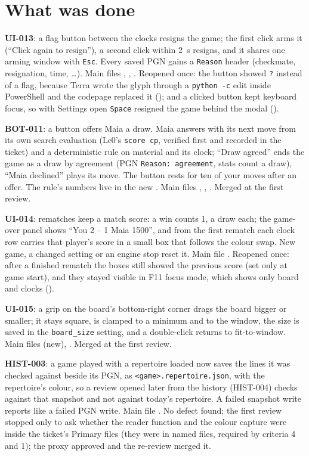 \documentclass[11pt,a4paper]{article}
\begin{document}
\section*{What was done}

\textbf{UI-013}: a flag button between the clocks resigns the game; the first click arms it
(``Click again to resign''), a second click within 2~s resigns, and it shares one arming window
with \texttt{Esc}. Every saved PGN gains a \texttt{Reason} header (checkmate, resignation, time,
\dots). Main files , , . Reopened once:
the button showed \texttt{?} instead of a flag, because Terra wrote the glyph through a
\texttt{python -c} edit inside PowerShell and the codepage replaced it ();
and a clicked button kept keyboard focus, so with Settings open \texttt{Space} resigned the
game behind the modal ().

\textbf{BOT-011}: a \textonehalf{} button offers Maia a draw. Maia answers with its next move
from its own search evaluation (Lc0's \texttt{score cp}, verified first and recorded in the
ticket) and a deterministic rule on material and its clock; ``Draw agreed'' ends the game as a
draw by agreement (PGN \texttt{Reason: agreement}, stats count a draw), ``Maia declined'' plays
its move. The button rests for ten of your moves after an offer. The rule's numbers live in the
new . Main files , ,
. Merged at the first review.

\textbf{UI-014}: rematches keep a match score: a win counts 1, a draw \textonehalf{} each; the
game-over panel shows ``You 2 -- 1 Maia 1500'', and from the first rematch each clock row
carries that player's score in a small box that follows the colour swap. New game, a changed
setting or an engine stop reset it. Main file . Reopened once: after a finished
rematch the boxes still showed the previous score (set only at game start), and they stayed
visible in F11 focus mode, which shows only board and clocks ().

\textbf{UI-015}: a grip on the board's bottom-right corner drags the board bigger or smaller; it
stays square, is clamped to a minimum and to the window, the size is saved in the
\texttt{board\_size} setting, and a double-click returns to fit-to-window. Main files
 (new), . Merged at the first review.

\textbf{HIST-003}: a game played with a repertoire loaded now saves the lines it was checked
against beside its PGN, as \texttt{<game>.repertoire.json}, with the repertoire's colour, so a
review opened later from the history (HIST-004) checks against that snapshot and not against
today's repertoire. A failed snapshot write reports like a failed PGN write. Main file
. No defect found; the first review stopped only to ask whether the
reader function and the colour capture were inside the ticket's Primary files (they were in
named files, required by criteria 4 and 1); the proxy approved and the re-review merged it.
\end{document}
